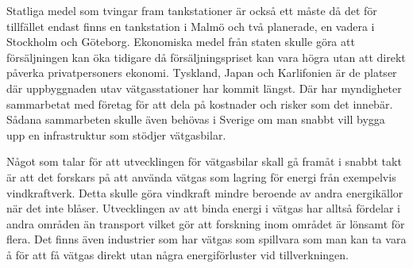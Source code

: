 \documentclass[a4paper,11pt,fleqn, titlepage]{article}
\begin{document}
Statliga medel som tvingar fram tankstationer är också ett måste då det för tillfället endast finns en tankstation i Malmö och två planerade, en vadera i Stockholm och Göteborg.
Ekonomiska medel från staten skulle göra att försäljningen kan öka tidigare då försäljningspriset kan vara högra utan att direkt påverka privatpersoners ekonomi.
Tyskland, Japan och Karlifonien är de platser där uppbyggnaden utav vätgasstationer har kommit längst. Där har myndigheter sammarbetat med företag för att dela på kostnader och risker som det innebär. Sådana sammarbeten skulle även behövas i Sverige om man snabbt vill bygga upp en infrastruktur som stödjer vätgasbilar.

Något som talar för att utvecklingen för vätgasbilar skall gå framåt i snabbt takt är att det forskars på att använda vätgas som lagring för energi från exempelvis vindkraftverk. Detta skulle göra vindkraft mindre beroende av andra energikällor när det inte blåser. Utvecklingen av att binda energi i vätgas har alltså fördelar i andra områden än transport vilket gör att forskning inom området är lönsamt för flera. Det finns även industrier som har vätgas som spillvara som man kan ta vara å för att få vätgas direkt utan några energiförluster vid tillverkningen.
\end{document}
